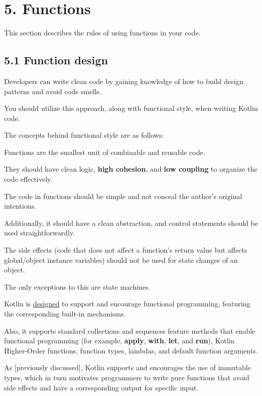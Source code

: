 \section*{\textbf{5. Functions}}

\label{sec:5.}

This section describes the rules of using functions in your code.

\subsection*{\textbf{5.1 Function design}}

\label{sec:5.1}

Developers can write clean code by gaining knowledge of how to build design patterns and avoid code smells.

You should utilize this approach, along with functional style, when writing Kotlin code. 

The concepts behind functional style are as follows: 

Functions are the smallest unit of combinable and reusable code.

They should have clean logic, \textbf{high cohesion}, and \textbf{low coupling} to organize the code effectively.

The code in functions should be simple and not conceal the author's original intentions.



Additionally, it should have a clean abstraction, and control statements should be used straightforwardly.

The side effects (code that does not affect a function's return value but affects global/object instance variables) should not be used for state changes of an object.

The only exceptions to this are state machines.



Kotlin is \href{https://www.slideshare.net/abreslav/whos-more-functional-kotlin-groovy-scala-or-java}{designed} to support and encourage functional programming, featuring the corresponding built-in mechanisms.

Also, it supports standard collections and sequences feature methods that enable functional programming (for example, \textbf{apply}, \textbf{with}, \textbf{let}, and \textbf{run}), Kotlin Higher-Order functions, function types, lambdas, and default function arguments.

As [previously discussed], Kotlin supports and encourages the use of immutable types, which in turn motivates programmers to write pure functions that avoid side effects and have a corresponding output for specific input. 

